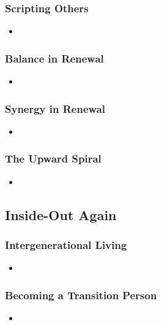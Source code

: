 \documentclass[11pt]{article}
\begin{document}
\subsubsection{Scripting Others}
\begin{itemize}
\item 
\end{itemize}
\subsubsection{Balance in Renewal}
\begin{itemize}
\item 
\end{itemize}
\subsubsection{Synergy in Renewal}
\begin{itemize}
\item 
\end{itemize}
\subsubsection{The Upward Spiral}
\begin{itemize}
\item 
\end{itemize}
\subsection{Inside-Out Again}
\subsubsection{Intergenerational Living}
\begin{itemize}
\item 
\end{itemize}
\subsubsection{Becoming a Transition Person}
\begin{itemize}
\item 
\end{itemize}
\newpage


\end{document}
